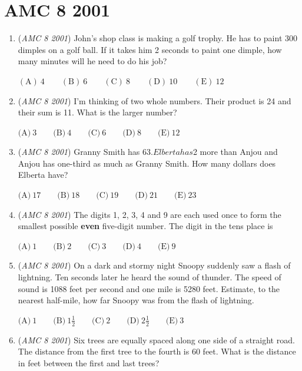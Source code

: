 \section{AMC 8 2001}
        \begin{enumerate}
        	\item (\textit{AMC 8 2001}) John's shop class is making a golf trophy. He has to paint 300 dimples on a golf ball. If it takes him 2 seconds to paint one dimple, how many minutes will he need to do his job?


 $\mathrm{(A) \ 4 } \qquad \mathrm{(B) \ 6 } \qquad \mathrm{(C) \ 8 } \qquad \mathrm{(D) \ 10 } \qquad \mathrm{(E) \ 12 }$


	\item (\textit{AMC 8 2001}) I'm thinking of two whole numbers. Their product is 24 and their sum is 11. What is the larger number?


 



 $\text{(A)}\ 3 \qquad \text{(B)}\ 4 \qquad \text{(C)}\ 6 \qquad \text{(D)}\ 8 \qquad \text{(E)}\ 12$


	\item (\textit{AMC 8 2001}) Granny Smith has $63. Elberta has $2 more than Anjou and Anjou has one-third as much as Granny Smith. How many dollars does Elberta have?


 $\text{(A)}\ 17 \qquad \text{(B)}\ 18 \qquad \text{(C)}\ 19 \qquad \text{(D)}\ 21 \qquad \text{(E)}\ 23$


	\item (\textit{AMC 8 2001}) The digits 1, 2, 3, 4 and 9 are each used once to form the smallest possible \textbf{even} five-digit number. The digit in the tens place is


 $\text{(A)}\ 1 \qquad \text{(B)}\ 2 \qquad \text{(C)}\ 3 \qquad \text{(D)}\ 4 \qquad \text{(E)}\ 9$


	\item (\textit{AMC 8 2001}) On a dark and stormy night Snoopy suddenly saw a flash of lightning. Ten seconds later he heard the sound of thunder. The speed of sound is 1088 feet per second and one mile is 5280 feet. Estimate, to the nearest half-mile, how far Snoopy was from the flash of lightning.


 $\text{(A)}\ 1 \qquad \text{(B)}\ 1\frac{1}{2} \qquad \text{(C)}\ 2 \qquad \text{(D)}\ 2\frac{1}{2} \qquad \text{(E)}\ 3$


	\item (\textit{AMC 8 2001}) Six trees are equally spaced along one side of a straight road. The distance from the first tree to the fourth is 60 feet. What is the distance in feet between the first and last trees?



\end{enumerate}
